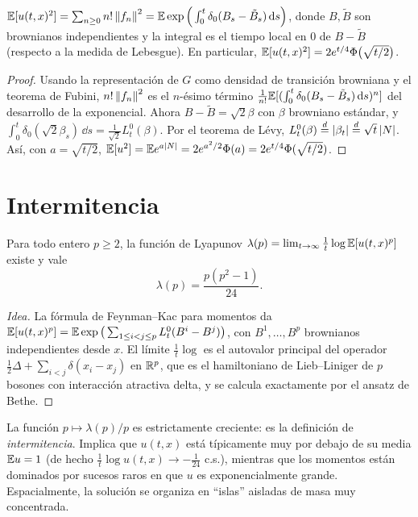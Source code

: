 \begin{proposicion}
$\mathbb{E}[u(t,x)^2]=\sum_{n\ge0}n!\left\lVert f_n\right\rVert^2=\mathbb{E}\exp\Big(\int_0^t\delta_0(B_s-\tilde B_s)\,\mathrm{d} s\Big)$, donde $B,\tilde B$ son
brownianos independientes y la integral es el tiempo local en 0 de $B-\tilde B$ (respecto a la medida
de Lebesgue). En particular, $\mathbb{E}[u(t,x)^2]=2e^{t/4}\Phi\big(\sqrt{t/2}\big)$.
\end{proposicion}

\begin{proof}
Usando la representación de $G$ como densidad de transición browniana y el
teorema de Fubini, $n!\left\lVert f_n\right\rVert^2$ es el $n$-ésimo término $\frac1{n!}\mathbb{E}[(\int_0^t\delta_0(B_s-\tilde B_s)\,\mathrm{d} s)^n]$ del desarrollo de la
exponencial. Ahora $B-\tilde B=\sqrt2\beta$ con $\beta$ browniano estándar, y $\int_0^t\delta_0(\sqrt2\beta_s)\,\dd s=\frac1{\sqrt2}L^0_t(\beta)$. Por
el teorema de Lévy, $L^0_t(\beta)\overset{d}{=}\left\lvert \beta_t\right\rvert\overset{d}{=}\sqrt t\left\lvert N\right\rvert$. Así, con $a=\sqrt{t/2}$, $\mathbb{E}[u^2]=\mathbb{E} e^{a\left\lvert N\right\rvert}=2e^{a^2/2}\Phi(a)=
2e^{t/4}\Phi(\sqrt{t/2})$.
\end{proof}

\section{Intermitencia}

\begin{teorema}
Para todo entero $p\ge2$, la \textup{función de Lyapunov}
$\lambda(p)=\lim_{t\to\infty}\frac1t\log\mathbb{E}[u(t,x)^p]$ existe y vale
\[
  \lambda(p)=\frac{p(p^2-1)}{24}.
\]
\end{teorema}

\begin{proof}[Idea]
La fórmula de Feynman--Kac para momentos da $\mathbb{E}[u(t,x)^p]=\mathbb{E}\exp\big(\sum_{1\le i<j\le p}L^0_t(B^i-
B^j)\big)$, con $B^1,\dots,B^p$ brownianos independientes desde $x$. El límite $\frac1t\log$ es el autovalor principal
del operador $\frac12\Delta+\sum_{i<j}\delta(x_i-x_j)$ en $\mathbb{R}^p$, que es el hamiltoniano de Lieb--Liniger de $p$ bosones
con interacción atractiva delta, y se calcula exactamente por el ansatz de Bethe.
\end{proof}

\begin{intuicion}
La función $p\mapsto\lambda(p)/p$ es estrictamente creciente: es la definición de \emph{intermitencia}.
Implica que $u(t,x)$ está típicamente muy por debajo de su media $\mathbb{E} u=1$ (de hecho
$\frac1t\log u(t,x)\to-\frac1{24}$ c.s.), mientras que los momentos están dominados por sucesos raros
en que $u$ es exponencialmente grande. Espacialmente, la solución se organiza en ``islas''
aisladas de masa muy concentrada.
\end{intuicion}

